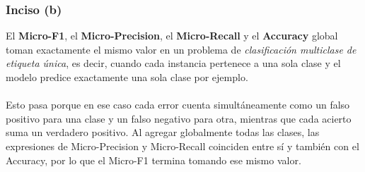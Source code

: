 \documentclass[a4paper,12pt]{article}
\begin{document}
                \subsubsection*{Inciso (b)}
                    \noindent El \textbf{Micro-F1}, el \textbf{Micro-Precision}, el \textbf{Micro-Recall} y el \textbf{Accuracy} global toman exactamente el mismo valor en un problema de \emph{clasificación multiclase de etiqueta única}, es decir, cuando cada instancia pertenece a una sola clase y el modelo predice exactamente una sola clase por ejemplo. \\
                    \\
                    Esto pasa porque en ese caso cada error cuenta simultáneamente como un falso positivo para una clase y un falso negativo para otra, mientras que cada acierto suma un verdadero positivo. Al agregar globalmente todas las clases, las expresiones de Micro-Precision y Micro-Recall coinciden entre sí y también con el Accuracy, por lo que el Micro-F1 termina tomando ese mismo valor.
\end{document}
